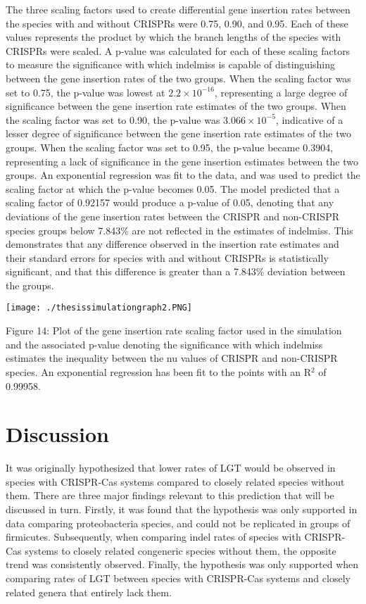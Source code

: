 \documentclass[english]{article}
\begin{document}
The three scaling factors used to create differential gene insertion
rates between the species with and without CRISPRs were 0.75, 0.90,
and 0.95. Each of these values represents the product by which the 
branch lengths of the species with CRISPRs were scaled. 
A p-value was calculated
for each of these scaling factors to measure the significance with
which indelmiss is capable of distinguishing between the gene
insertion rates of the two groups. When the
scaling factor was set to 0.75, the p-value was lowest at $2.2 \times
10^{-16}$, representing a large degree of significance between the
gene insertion rate estimates of the two groups. When the scaling
factor was set to 0.90, the p-value was $3.066 \times 10^{-5}$,
indicative of a lesser degree of significance between the gene
insertion rate estimates of the two groups. When the scaling factor was set to
0.95, the p-value became 0.3904, representing a lack of significance
in the gene insertion estimates between the two groups. An exponential
regression was fit to the data, and was used to predict the scaling
factor at which the p-value becomes 0.05. The model predicted that a
scaling factor of 0.92157 would produce a p-value of 0.05, denoting
that any deviations of the gene insertion rates between the CRISPR and
non-CRISPR species groups below 7.843\% are not reflected in the
estimates of indelmiss. This demonstrates that any difference observed in the
insertion rate estimates
and their standard errors for species with and without CRISPRs is
statistically significant, and that this difference is greater than a
7.843\% deviation between the groups.
      

\singlespacing
\texttt{[image: ./thesissimulationgraph2.PNG]}
\caption{Figure 14: Plot of the gene insertion rate scaling
factor used in the simulation and the associated p-value 
denoting the significance with which indelmiss
estimates the inequality between the nu values of CRISPR and
non-CRISPR species. An exponential regression has been fit 
to the points with an R$^2$ of 0.99958.}
\singlespacing

\section{Discussion}
\thefontsize\large
\onehalfspacing

It was originally hypothesized that lower rates of LGT would be
observed in species with CRISPR-Cas systems compared to closely
related species without them.  There are three major findings relevant
to this prediction that will be discussed in turn. Firstly, it was
found that the hypothesis was only supported in data comparing
proteobacteria species, and could not be replicated in groups of
firmicutes. Subsequently, when comparing indel rates of species with
CRISPR-Cas systems to closely related congeneric species without them,
the opposite trend was consistently observed. Finally, the hypothesis
was only supported when comparing rates of LGT between species with
CRISPR-Cas systems and closely related genera that entirely lack
them. 
\end{document}
